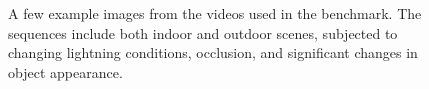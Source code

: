 \begin{figure}[!htb]
{	}
\caption{A few example images from the videos used in the benchmark. The sequences include both indoor and outdoor scenes, subjected to changing lightning conditions, 
occlusion, and significant changes in object appearance.}
\vspace{-3mm}
\label{fig:tracking_results}
\end{figure}





